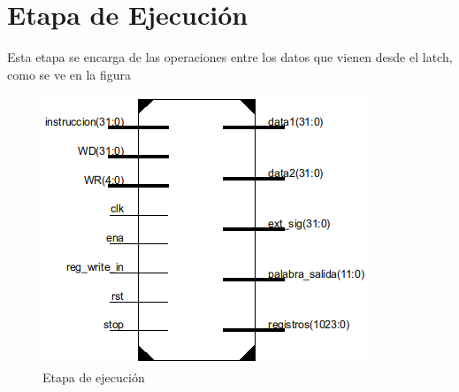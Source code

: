 \section{Etapa de Ejecuci\'on}
Esta etapa se encarga de las operaciones entre los datos que vienen desde el latch, como se ve en la figura 

\begin{figure}[H]
\centering
\includegraphics[scale=0.35]{img/decode_stage}
\caption{Etapa de ejecuci\'on}
\label{fig:fetch}
\end{figure}